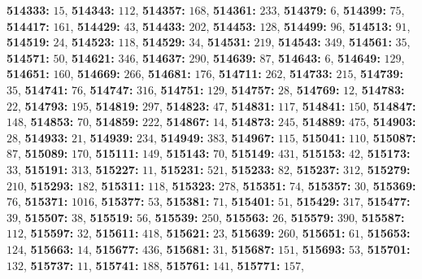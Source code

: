 \textsf{\bfseries 514333:} $15$, \textsf{\bfseries 514343:} $112$, \textsf{\bfseries 514357:} $168$, \textsf{\bfseries 514361:} $233$, \textsf{\bfseries 514379:} $6$, \textsf{\bfseries 514399:} $75$, \textsf{\bfseries 514417:} $161$, \textsf{\bfseries 514429:} $43$, \textsf{\bfseries 514433:} $202$, \textsf{\bfseries 514453:} $128$, \textsf{\bfseries 514499:} $96$, \textsf{\bfseries 514513:} $91$, \textsf{\bfseries 514519:} $24$, \textsf{\bfseries 514523:} $118$, \textsf{\bfseries 514529:} $34$, \textsf{\bfseries 514531:} $219$, \textsf{\bfseries 514543:} $349$, \textsf{\bfseries 514561:} $35$, \textsf{\bfseries 514571:} $50$, \textsf{\bfseries 514621:} $346$, \textsf{\bfseries 514637:} $290$, \textsf{\bfseries 514639:} $87$, \textsf{\bfseries 514643:} $6$, \textsf{\bfseries 514649:} $129$, \textsf{\bfseries 514651:} $160$, \textsf{\bfseries 514669:} $266$, \textsf{\bfseries 514681:} $176$, \textsf{\bfseries 514711:} $262$, \textsf{\bfseries 514733:} $215$, \textsf{\bfseries 514739:} $35$, \textsf{\bfseries 514741:} $76$, \textsf{\bfseries 514747:} $316$, \textsf{\bfseries 514751:} $129$, \textsf{\bfseries 514757:} $28$, \textsf{\bfseries 514769:} $12$, \textsf{\bfseries 514783:} $22$, \textsf{\bfseries 514793:} $195$, \textsf{\bfseries 514819:} $297$, \textsf{\bfseries 514823:} $47$, \textsf{\bfseries 514831:} $117$, \textsf{\bfseries 514841:} $150$, \textsf{\bfseries 514847:} $148$, \textsf{\bfseries 514853:} $70$, \textsf{\bfseries 514859:} $222$, \textsf{\bfseries 514867:} $14$, \textsf{\bfseries 514873:} $245$, \textsf{\bfseries 514889:} $475$, \textsf{\bfseries 514903:} $28$, \textsf{\bfseries 514933:} $21$, \textsf{\bfseries 514939:} $234$, \textsf{\bfseries 514949:} $383$, \textsf{\bfseries 514967:} $115$, \textsf{\bfseries 515041:} $110$, \textsf{\bfseries 515087:} $87$, \textsf{\bfseries 515089:} $170$, \textsf{\bfseries 515111:} $149$, \textsf{\bfseries 515143:} $70$, \textsf{\bfseries 515149:} $431$, \textsf{\bfseries 515153:} $42$, \textsf{\bfseries 515173:} $33$, \textsf{\bfseries 515191:} $313$, \textsf{\bfseries 515227:} $11$, \textsf{\bfseries 515231:} $521$, \textsf{\bfseries 515233:} $82$, \textsf{\bfseries 515237:} $312$, \textsf{\bfseries 515279:} $210$, \textsf{\bfseries 515293:} $182$, \textsf{\bfseries 515311:} $118$, \textsf{\bfseries 515323:} $278$, \textsf{\bfseries 515351:} $74$, \textsf{\bfseries 515357:} $30$, \textsf{\bfseries 515369:} $76$, \textsf{\bfseries 515371:} $1016$, \textsf{\bfseries 515377:} $53$, \textsf{\bfseries 515381:} $71$, \textsf{\bfseries 515401:} $51$, \textsf{\bfseries 515429:} $317$, \textsf{\bfseries 515477:} $39$, \textsf{\bfseries 515507:} $38$, \textsf{\bfseries 515519:} $56$, \textsf{\bfseries 515539:} $250$, \textsf{\bfseries 515563:} $26$, \textsf{\bfseries 515579:} $390$, \textsf{\bfseries 515587:} $112$, \textsf{\bfseries 515597:} $32$, \textsf{\bfseries 515611:} $418$, \textsf{\bfseries 515621:} $23$, \textsf{\bfseries 515639:} $260$, \textsf{\bfseries 515651:} $61$, \textsf{\bfseries 515653:} $124$, \textsf{\bfseries 515663:} $14$, \textsf{\bfseries 515677:} $436$, \textsf{\bfseries 515681:} $31$, \textsf{\bfseries 515687:} $151$, \textsf{\bfseries 515693:} $53$, \textsf{\bfseries 515701:} $132$, \textsf{\bfseries 515737:} $11$, \textsf{\bfseries 515741:} $188$, \textsf{\bfseries 515761:} $141$, \textsf{\bfseries 515771:} $157$, 
